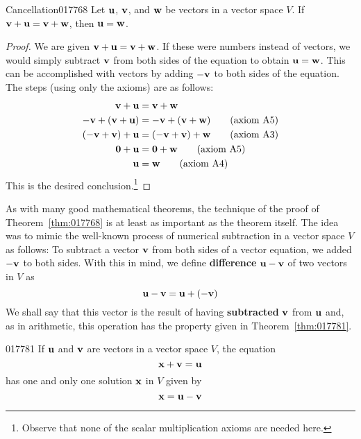 \begin{theorem}{Cancellation}{017768} %
Let $\textbf{u}$, $\textbf{v}$, and $\textbf{w}$ be vectors in a vector space $V$. If $\textbf{v} + \textbf{u} = \textbf{v} + \textbf{w}$, then $\textbf{u} = \textbf{w}$.
\end{theorem}
\vspace{-1em}
\begin{proof}
We are given $\textbf{v} + \textbf{u} = \textbf{v} + \textbf{w}$. If these were numbers instead of vectors, we would simply subtract $\textbf{v}$ from both sides of the equation to obtain $\textbf{u} = \textbf{w}$. This can be accomplished with vectors by adding $-\textbf{v}$ to both sides of the equation. The steps (using only the axioms) are as follows:
\begin{align}
\textbf{v} + \textbf{u} &= \textbf{v} + \textbf{w} \nonumber \\
-\textbf{v} + (\textbf{v} + \textbf{u}) &= -\textbf{v} + (\textbf{v} + \textbf{w}) \tag{axiom A5} \\
(-\textbf{v} + \textbf{v}) + \textbf{u} &= (-\textbf{v} + \textbf{v}) + \textbf{w} \tag{axiom A3} \\
\textbf{0} + \textbf{u} &= \textbf{0} + \textbf{w} \tag{axiom A5} \\
\textbf{u} &= \textbf{w} \tag{axiom A4}
\end{align} 
This is the desired conclusion.\footnote{Observe that none of the scalar multiplication axioms are needed here.}
\end{proof}

As with many good mathematical theorems, the technique of the proof of
Theorem~\ref{thm:017768} is at least as important as the theorem
itself. The idea was to mimic the well-known process of numerical
subtraction in a vector space $V$ as follows: To subtract a vector
$\textbf{v}$ from both sides of a vector equation, we added $-\textbf{v}$
to both sides. With this in mind, we define \textbf{difference} $\textbf{u} - \textbf{v}$ of two vectors in $V$ as
\begin{equation*}
\textbf{u} - \textbf{v} = \textbf{u} + (-\textbf{v})
\end{equation*}
We shall say that this vector is the result of having \textbf{subtracted} $\textbf{v}$ from $\textbf{u}$ and, as in arithmetic, this operation has the property given in Theorem~\ref{thm:017781}.

\begin{theorem}{}{017781} %
If $\textbf{u}$ and $\textbf{v}$ are vectors in a vector space $V$, the equation
\begin{equation*}
\textbf{x} + \textbf{v} = \textbf{u}
\end{equation*}
has one and only one solution $\textbf{x}$ in $V$ given by
\begin{equation*}
\textbf{x} = \textbf{u} - \textbf{v}
\end{equation*}
\end{theorem}

